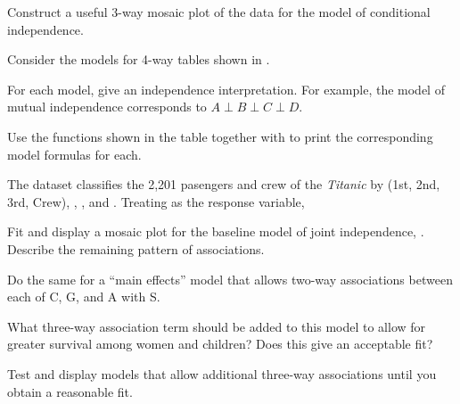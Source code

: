 \documentclass[10pt]{report}\usepackage[]{graphicx}\usepackage[]{color}
\begin{document}
\begin{Exercises}
\begin{enumerate*}
      \item Construct a useful 3-way mosaic plot of the data for the model of conditional independence.
      \begin{ans}
      \end{ans}
      
    \end{enumerate*}

\exercise Consider the models for 4-way tables shown in . 
  \begin{enumerate*}
    \item For each model, give an independence interpretation.  For example, the model of mutual
    independence corresponds to $A \perp B \perp C \perp D$.
    \begin{ans}
    \end{ans}
    
    \item Use the functions shown in the table together with  to print the
    corresponding model formulas for each.
    \begin{ans}
    \end{ans}
    
  \end{enumerate*}
  
  \exercise\label{lab:mosaic-titanic} The dataset  classifies the 2,201 pasengers and crew of the \emph{Titanic}
  by  (1st, 2nd, 3rd, Crew), , , and . Treating  as the response variable,
    \begin{enumerate*}
      \item Fit and display a mosaic plot for the baseline model of joint independence, . Describe the remaining
      pattern of associations.
      \begin{ans}
      \end{ans}
      
      \item Do the same for a ``main effects'' model that allows two-way associations between each of C, G, and A with S.
      \begin{ans}
      \end{ans}
      
      \item What three-way association term should be added to this model to allow for greater survival among women and children?
      Does this give an acceptable fit?
      \begin{ans}
      \end{ans}
      
      \item Test and display models that allow additional three-way associations until you obtain 
      a reasonable fit.
      \begin{ans}
      \end{ans}
      
    \end{enumerate*}
  
\end{Exercises}
\end{document}
